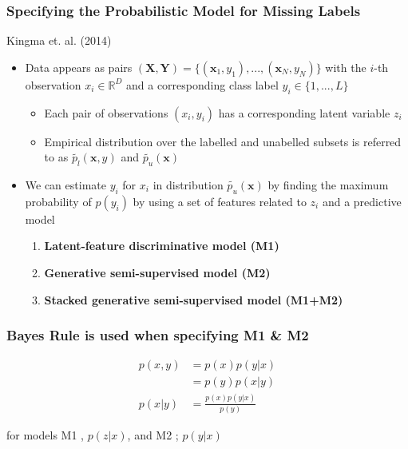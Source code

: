 \documentclass{beamer}
\begin{document}
\begin{frame}
  \frametitle{Specifying the Probabilistic Model for Missing Labels}

  Kingma et. al. (2014)
  
    \begin{itemize}
  \item Data appears as pairs $(\mathbf{X}, \mathbf{Y}) =
    \{(\mathbf{x}_1, y_1), ..., (\mathbf{x}_N, y_N)\}$
  with the $i$-th observation $x_i \in \mathbb{R}^D$ and a
  corresponding class label $y_i \in \{1, ..., L\}$

  \begin{itemize}
\item Each pair of observations $(x_i,y_i)$ has a corresponding
  latent variable $z_i$

\item Empirical distribution over the labelled and unabelled subsets
  is referred to as $\tilde{p_l}(\mathbf{x}, y)$ and
  $\tilde{p_u}(\mathbf{x})$
  \end{itemize}
\item We can estimate $y_i$ for $x_i$ in distribution
  $\tilde{p_u}(\mathbf{x})$ by finding the maximum
  probability of $p(y_i)$ by using a set of features
  related to $z_i$ and a predictive model
  \begin{enumerate}
  \item \textbf{Latent-feature discriminative model (M1)}
  \item \textbf{Generative semi-supervised model (M2)}
  \item \textbf{Stacked generative semi-supervised model (M1+M2)}
  \end{enumerate}
  \end{itemize}
  \end{frame}

\begin{frame}
  \frametitle{Bayes Rule is used when specifying M1 \& M2}

  \begin{align*}
    p(x,y) &= p(x)p(y|x) \\
    &= p(y)p(x|y) \\
    p(x|y) &= \frac{p(x)p(y|x)}{p(y)}
  \end{align*}

  for models M1 \footnotemark, $p(z|x)$, and M2 \footnotemark; $p(y|x)$

  
\end{frame}
\end{document}
